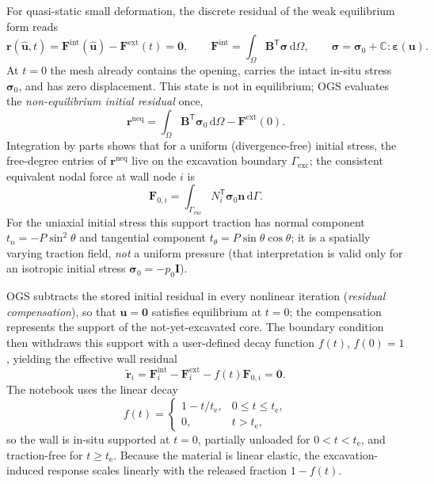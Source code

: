 \documentclass[11pt,a4paper]{tubaf-report}
\newcommand{\ud}{\,\mathrm{d}}
\newcommand{\vect}[1]{\bm{#1}}
\newcommand{\ten}[1]{\bm{#1}}
\newcommand{\B}{\mathbf{B}}
\newcommand{\trans}{\mathsf{T}}
\begin{document}
For quasi-static small deformation, the discrete residual of the weak
equilibrium form reads
\begin{equation}
  \vect{r}(\hat{\vect{u}},t)
  =\vect{F}^{\mathrm{int}}(\hat{\vect{u}})
   -\vect{F}^{\mathrm{ext}}(t)=\vect{0},
  \qquad
  \vect{F}^{\mathrm{int}}
  =\int_\Omega \B^{\trans}\vect{\sigma}\ud\Omega,
  \qquad
  \ten{\sigma}=\ten{\sigma}_0+\mathbb{C}:\ten{\varepsilon}(\vect{u}).
  \label{eq:discrete-residual}
\end{equation}
At $t=0$ the mesh already contains the opening, carries the intact in-situ
stress $\ten{\sigma}_0$, and has zero displacement. This state is not in
equilibrium; OGS evaluates the \emph{non-equilibrium initial residual} once,
\begin{equation}
  \vect{r}^{\mathrm{neq}}
  =\int_\Omega\B^{\trans}\vect{\sigma}_0\ud\Omega
   -\vect{F}^{\mathrm{ext}}(0).
  \label{eq:rneq}
\end{equation}
Integration by parts shows that for a uniform (divergence-free) initial
stress, the free-degree entries of $\vect{r}^{\mathrm{neq}}$ live on the
excavation boundary $\Gamma_{\mathrm{exc}}$; the consistent equivalent nodal
force at wall node $i$ is
\begin{equation}
  \vect{F}_{0,i}
  =\int_{\Gamma_{\mathrm{exc}}}
    N_i^{\trans}\ten{\sigma}_0\vect{n}\ud\Gamma .
  \label{eq:F0}
\end{equation}
For the uniaxial initial stress this support traction has normal
component $t_n=-P\sin^2\theta$ and tangential component
$t_\theta=P\sin\theta\cos\theta$; it is a spatially varying traction field,
\emph{not} a uniform pressure (that interpretation is valid only for an
isotropic initial stress $\ten{\sigma}_0=-p_0\mathbf{I}$).

OGS subtracts the stored initial residual in every nonlinear iteration
(\emph{residual compensation}), so that $\vect{u}=\vect{0}$ satisfies
equilibrium at $t=0$; the compensation represents the support of the
not-yet-excavated core. The boundary condition then withdraws this support
with a user-defined decay function $f(t)$, $f(0)=1$, yielding the effective
wall residual
\begin{equation}
  \boxed{\tilde{\vect{r}}_i
  =\vect{F}^{\mathrm{int}}_i
   -\vect{F}^{\mathrm{ext}}_i
   -f(t)\vect{F}_{0,i}=\vect{0}.}
  \label{eq:effective-residual}
\end{equation}
The notebook uses the linear decay
\begin{equation}
  f(t)=
  \begin{cases}
    1-t/t_{\mathrm e}, & 0\le t\le t_{\mathrm e},\\[4pt]
    0, & t>t_{\mathrm e},
  \end{cases}
  \label{eq:decay}
\end{equation}
so the wall is in-situ supported at $t=0$, partially unloaded for
$0<t<t_{\mathrm e}$, and traction-free for $t\ge t_{\mathrm e}$. Because the
material is linear elastic, the excavation-induced response scales linearly
with the released fraction $1-f(t)$.
\end{document}
